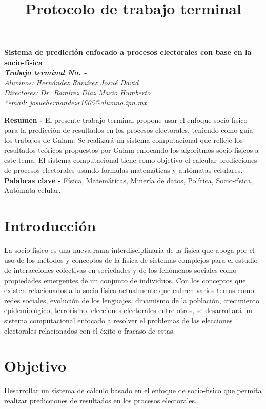 \documentclass[letterpaper, 10pt]{article}
\title{Protocolo de trabajo terminal}
\def\letra#1#2{%
\tamanyo=#1%
\interlinea=1.2\tamanyo%
\fontfamily{ptm}
\fontsize{\the\tamanyo}%
{\the\interlinea}\selectfont#2}
\begin{document}
\begin{center}
    \letra{14pt}{\textbf{Sistema de predicción enfocado a procesos electorales con base en la socio-física}}\\
    \letra{12pt}{\textbf{\textit{Trabajo terminal No. -}}} \\
    \letra{12pt}{\textit{Alumnos: Hernández Ramírez Josué David}} \\
    \letra{12pt}{\textit{Directores: Dr. Ramírez Díaz Mario Humberto}} \\
    \letra{12pt}{\textcolor{black}{\textit{*email: \url{josuehernandezr1605@alumno.ipn.mx}}}}
\end{center}
\newline
\textbf{Resumen -} El presente trabajo terminal propone usar el enfoque socio físico para la predicción de resultados en los procesos electorales, teniendo como guía los trabajos de Galam. Se realizará un sistema computacional que refleje los resultados teóricos propuestos por Galam enfocando los algoritmos socio físicos a este tema. El sistema computacional tiene como objetivo el calcular predicciones de procesos electorales usando formulas matemáticas y autómatas celulares.
\newline
\textbf{Palabras clave -} Física, Matemáticas, Minería de datos, Política, Socio-física, Autómata celular.

\section{Introducción}

La socio-físico es una nueva rama interdisciplinaria de la física que aboga por el uso de los métodos y conceptos de la física de sistemas complejos para el estudio de interacciones colectivas en sociedades y de los fenómenos sociales como propiedades emergentes de un conjunto de individuos. \cite{MarioH.RamirezDiaz2014} 
\newline
\newline
Con los conceptos que existen relacionados a la socio física actualmente que cubren varios temas como: redes sociales, evolución de los lenguajes, dinamismo de la población, crecimiento epidemiológico, terrorismo, elecciones electorales entre otros, se desarrollará un sistema computacional enfocado a resolver el problemas de las elecciones electorales relacionados con el éxito o fracaso de estas. \cite{Galam.1986}

\section{Objetivo}
Desarrollar un sistema de cálculo basado en el enfoque de socio-físico que permita realizar predicciones de resultados en los procesos electorales. 
\end{document}
